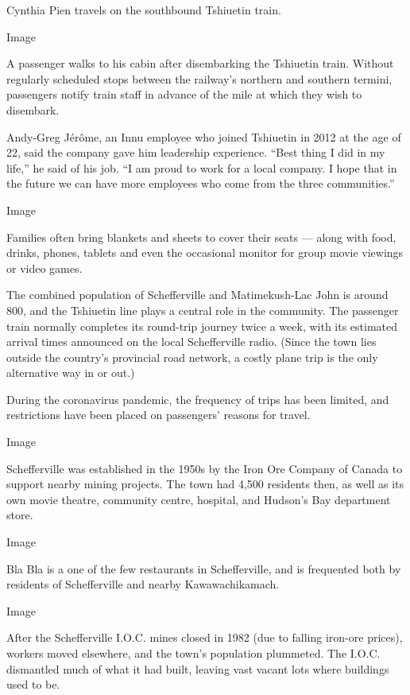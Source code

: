 Cynthia Pien travels on the southbound Tshiuetin train.

Image

A passenger walks to his cabin after disembarking the Tshiuetin train.
Without regularly scheduled stops between the railway's northern and
southern termini, passengers notify train staff in advance of the mile
at which they wish to disembark.

Andy-Greg Jérôme, an Innu employee who joined Tshiuetin in 2012 at the
age of 22, said the company gave him leadership experience. ``Best thing
I did in my life,'' he said of his job. ``I am proud to work for a local
company. I hope that in the future we can have more employees who come
from the three communities.''

Image

Families often bring blankets and sheets to cover their seats --- along
with food, drinks, phones, tablets and even the occasional monitor for
group movie viewings or video games.

The combined population of Schefferville and Matimekush-Lac John is
around 800, and the Tshiuetin line plays a central role in the
community. The passenger train normally completes its round-trip journey
twice a week, with its estimated arrival times announced on the local
Schefferville radio. (Since the town lies outside the country's
provincial road network, a costly plane trip is the only alternative way
in or out.)

During the coronavirus pandemic, the frequency of trips has been
limited, and restrictions have been placed on passengers' reasons for
travel.

Image

Schefferville was established in the 1950s by the Iron Ore Company of
Canada to support nearby mining projects. The town had 4,500 residents
then, as well as its own movie theatre, community centre, hospital, and
Hudson's Bay department store.

Image

Bla Bla is a one of the few restaurants in Schefferville, and is
frequented both by residents of Schefferville and nearby
Kawawachikamach.

Image

After the Schefferville I.O.C. mines closed in 1982 (due to falling
iron-ore prices), workers moved elsewhere, and the town's population
plummeted. The I.O.C. dismantled much of what it had built, leaving vast
vacant lots where buildings used to be.

